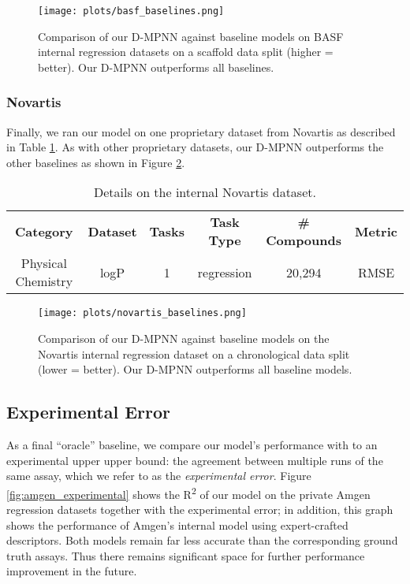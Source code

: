 \documentclass[journal=jcisd8,manuscript=article]{achemso}
\begin{document}
\FloatBarrier

\begin{figure}
    \centering
    \texttt{[image: plots/basf\_baselines.png]}
    \caption{Comparison of our D-MPNN against baseline models on BASF internal regression datasets on a scaffold data split (higher = better). Our D-MPNN outperforms all baselines.}
    \label{fig:basf_baselines}
\end{figure}

\subsubsection{Novartis}

Finally, we ran our model on one proprietary dataset from Novartis as described in Table \ref{tab:novartis_datasets}. As with other proprietary datasets, our D-MPNN outperforms the other baselines as shown in Figure \ref{fig:novartis_baselines}.

\FloatBarrier
\begin{table}[]
\centering
\begin{tabular}{|c|c|c|c|c|c|}
\hline
\textbf{Category}           & \textbf{Dataset}   & \textbf{Tasks} & \textbf{Task Type} & \textbf{\# Compounds} & \textbf{Metric} \\
\Xhline{2\arrayrulewidth}
Physical Chemistry & logP      & 1 & regression   & 20,294         & RMSE   \\
\hline
\end{tabular}
\caption{Details on the internal Novartis dataset.}
\label{tab:novartis_datasets}
\end{table}

\begin{figure}
    \centering
    \texttt{[image: plots/novartis\_baselines.png]}
    \caption{Comparison of our D-MPNN against baseline models on the Novartis internal regression dataset on a chronological data split (lower = better). Our D-MPNN outperforms all baseline models.}
    \label{fig:novartis_baselines}
\end{figure}

\subsection{Experimental Error}

As a final ``oracle'' baseline, we compare our model's performance with to an experimental upper upper bound: the agreement between multiple runs of the same assay, which we refer to as the \textit{experimental error}. Figure \ref{fig:amgen_experimental} shows the R\textsuperscript{2} of our model on the private Amgen regression datasets together with the experimental error; in addition, this graph shows the performance of Amgen's internal model using expert-crafted descriptors. Both models remain far less accurate than the corresponding ground truth assays. Thus there remains significant space for further performance improvement in the future. 
\end{document}
